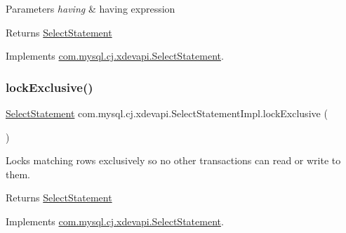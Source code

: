 \begin{DoxyParams}{Parameters}
{\em having} & having expression \\
\hline
\end{DoxyParams}
\begin{DoxyReturn}{Returns}
\mbox{\hyperlink{interfacecom_1_1mysql_1_1cj_1_1xdevapi_1_1_select_statement}{Select\+Statement}} 
\end{DoxyReturn}


Implements \mbox{\hyperlink{interfacecom_1_1mysql_1_1cj_1_1xdevapi_1_1_select_statement_ab1dde96bbcd60811cce5a6181008d441}{com.\+mysql.\+cj.\+xdevapi.\+Select\+Statement}}.

\mbox{\label{classcom_1_1mysql_1_1cj_1_1xdevapi_1_1_select_statement_impl_a53aaa86b0305024bdd172a02e975b006}} 
\subsubsection{\texorpdfstring{lock\+Exclusive()}{lockExclusive()}\hspace{0.1cm}{\footnotesize\ttfamily [1/2]}}
{\footnotesize\ttfamily \mbox{\hyperlink{interfacecom_1_1mysql_1_1cj_1_1xdevapi_1_1_select_statement}{Select\+Statement}} com.\+mysql.\+cj.\+xdevapi.\+Select\+Statement\+Impl.\+lock\+Exclusive (\begin{DoxyParamCaption}{ }\end{DoxyParamCaption})}

Locks matching rows exclusively so no other transactions can read or write to them.

\begin{DoxyReturn}{Returns}
\mbox{\hyperlink{interfacecom_1_1mysql_1_1cj_1_1xdevapi_1_1_select_statement}{Select\+Statement}} 
\end{DoxyReturn}


Implements \mbox{\hyperlink{interfacecom_1_1mysql_1_1cj_1_1xdevapi_1_1_select_statement_a86b185579eb689c07a5691ba33c59821}{com.\+mysql.\+cj.\+xdevapi.\+Select\+Statement}}.

\mbox{\label{classcom_1_1mysql_1_1cj_1_1xdevapi_1_1_select_statement_impl_afbaa870747c558133a85fcc536658503}} 
